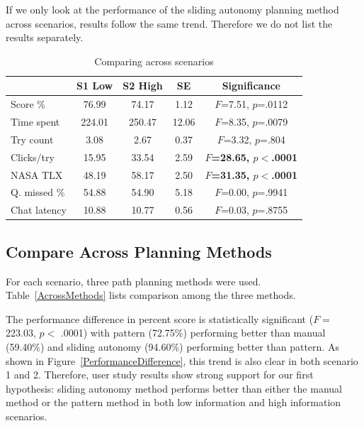 \documentclass[journal]{IEEEtran}
\begin{document}
If we only look at the performance of the sliding autonomy planning method across scenarios, results follow the same trend. Therefore we do not list the results separately.

\begin{table}
\caption{Comparing across scenarios}
\scriptsize
	\centering
		\begin{tabular}
			{|l|c|c|c|c|}
			\hline
			& S1 Low & S2 High & SE & Significance \\
			\hline
			Score \% & 76.99 & 74.17 & 1.12 & $F$=7.51, $p$=.0112 \\
			Time spent & 224.01 & 250.47 & 12.06 & $F$=8.35, $p$=.0079 \\
			Try count & 3.08 & 2.67 & 0.37 & $F$=3.32, $p$=.804 \\
			Clicks/try	& 15.95 & 33.54 & 2.59 & \textbf{$F$=28.65, $p<$.0001} \\ 
			NASA TLX & 48.19 & 58.17 & 2.50 & \textbf{$F$=31.35, $p<$.0001} \\ 
			\hline
			Q. missed \% & 54.88 & 54.90 & 5.18 & $F$=0.00, $p$=.9941 \\ 
			Chat latency & 10.88 & 10.77 & 0.56 & $F$=0.03, $p$=.8755 \\ 
			\hline			
		\end{tabular}
\label{AcrossScenarios}
\end{table}

\subsection{Compare Across Planning Methods}

For each scenario, three path planning methods were used. Table~\ref{AcrossMethods} lists comparison among the three methods. 

The performance difference in percent score is statistically significant ($F=$ 223.03, $p<$ .0001) with pattern (72.75\%) performing better than manual (59.40\%) and sliding autonomy (94.60\%) performing better than pattern. As shown in Figure~\ref{PerformanceDifference}, this trend is also clear in both scenario 1 and 2. Therefore, user study results show strong support for our first hypothesis: sliding autonomy method performs better than either the manual method or the pattern method in both low information and high information scenarios.
\end{document}
